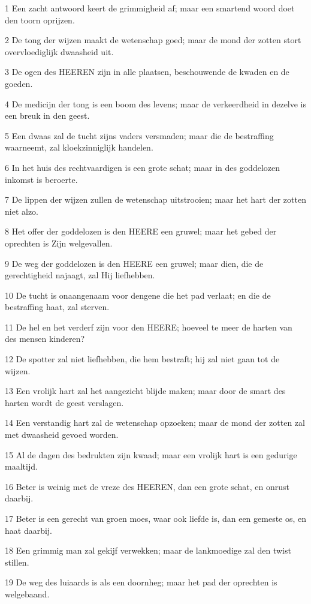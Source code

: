 \par 1 Een zacht antwoord keert de grimmigheid af; maar een smartend woord doet den toorn oprijzen.
\par 2 De tong der wijzen maakt de wetenschap goed; maar de mond der zotten stort overvloediglijk dwaasheid uit.
\par 3 De ogen des HEEREN zijn in alle plaatsen, beschouwende de kwaden en de goeden.
\par 4 De medicijn der tong is een boom des levens; maar de verkeerdheid in dezelve is een breuk in den geest.
\par 5 Een dwaas zal de tucht zijns vaders versmaden; maar die de bestraffing waarneemt, zal kloekzinniglijk handelen.
\par 6 In het huis des rechtvaardigen is een grote schat; maar in des goddelozen inkomst is beroerte.
\par 7 De lippen der wijzen zullen de wetenschap uitstrooien; maar het hart der zotten niet alzo.
\par 8 Het offer der goddelozen is den HEERE een gruwel; maar het gebed der oprechten is Zijn welgevallen.
\par 9 De weg der goddelozen is den HEERE een gruwel; maar dien, die de gerechtigheid najaagt, zal Hij liefhebben.
\par 10 De tucht is onaangenaam voor dengene die het pad verlaat; en die de bestraffing haat, zal sterven.
\par 11 De hel en het verderf zijn voor den HEERE; hoeveel te meer de harten van des mensen kinderen?
\par 12 De spotter zal niet liefhebben, die hem bestraft; hij zal niet gaan tot de wijzen.
\par 13 Een vrolijk hart zal het aangezicht blijde maken; maar door de smart des harten wordt de geest verslagen.
\par 14 Een verstandig hart zal de wetenschap opzoeken; maar de mond der zotten zal met dwaasheid gevoed worden.
\par 15 Al de dagen des bedrukten zijn kwaad; maar een vrolijk hart is een gedurige maaltijd.
\par 16 Beter is weinig met de vreze des HEEREN, dan een grote schat, en onrust daarbij.
\par 17 Beter is een gerecht van groen moes, waar ook liefde is, dan een gemeste os, en haat daarbij.
\par 18 Een grimmig man zal gekijf verwekken; maar de lankmoedige zal den twist stillen.
\par 19 De weg des luiaards is als een doornheg; maar het pad der oprechten is welgebaand.
